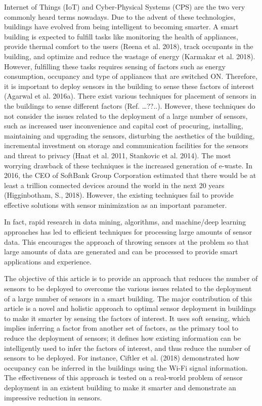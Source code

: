 \documentclass[]{interact}
\theoremstyle{plain}%
\theoremstyle{definition}
\theoremstyle{remark}
\begin{document}
Internet of Things (IoT) and Cyber-Physical Systems (CPS) are the two very commonly heard terms nowadays. Due to the advent of these technologies, buildings have evolved from being intelligent to becoming smarter. A smart building is expected to fulfill tasks like monitoring the health of appliances, provide thermal comfort to the users (Reena et al. 2018), track occupants in the building, and optimize and reduce the wastage of energy (Karmakar et al. 2018). However, fulfilling these tasks requires sensing of factors such as energy consumption, occupancy and type of appliances that are switched ON. Therefore, it is important to deploy sensors in the building to sense these factors of interest (Agarwal et al. 2016a). There exist various techniques for placement of sensors in the buildings to sense different factors (Ref. …??..). However, these techniques do not consider the issues related to the deployment of a large number of sensors, such as increased user inconvenience and capital cost of procuring, installing, maintaining and upgrading the sensors, disturbing the aesthetics of the building, incremental investment on storage and communication facilities for the sensors and threat to privacy (Hnat et al. 2011, Stankovic et al. 2014). The most worrying drawback of these techniques is the increased generation of e-waste. 
In 2016, the CEO of SoftBank Group Corporation estimated that there would be at least a trillion connected devices around the world in the next 20 years (Higginbotham, S., 2018). However, the existing techniques fail to provide effective solutions with sensor minimization as an important parameter.

In fact, rapid research in data mining, algorithms, and machine/deep learning approaches has led to efficient techniques for processing large amounts of sensor data. This encourages the approach of throwing sensors at the problem so that large amounts of data are generated and can be processed to provide smart applications and experience. 

The objective of this article is to provide an approach that reduces the number of sensors to be deployed to overcome the various issues related to the deployment of a large number of sensors in a smart building. The major contribution of this article is a novel and holistic approach to optimal sensor deployment in buildings to make it smarter by sensing the factors of interest. It uses soft sensing, which implies inferring a factor from another set of factors, as the primary tool to reduce the deployment of sensors; it defines how existing information can be intelligently used to infer the factors of interest, and thus reduce the number of sensors to be deployed. For instance, Ciftler et al. (2018) demonstrated how occupancy can be inferred in the buildings using the Wi-Fi signal information. The effectiveness of this approach is tested on a real-world problem of sensor deployment in an existent building to make it smarter and demonstrate an impressive reduction in sensors.
\end{document}
